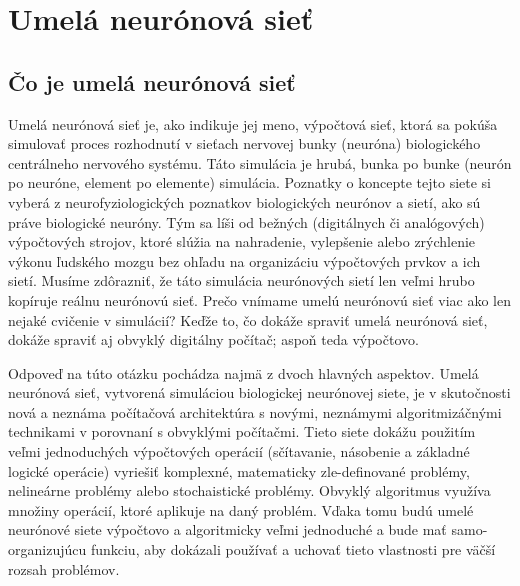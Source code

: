 \chapter{Umelá neurónová sieť}
\section{Čo je umelá neurónová sieť}
Umelá neurónová sieť je, ako indikuje jej meno, výpočtová sieť, ktorá sa pokúša simulovať proces rozhodnutí v sieťach nervovej bunky (neuróna) biologického centrálneho nervového systému. Táto simulácia je hrubá, bunka po bunke (neurón po neuróne, element po elemente) simulácia. Poznatky o koncepte tejto siete si vyberá z neurofyziologických poznatkov biologických neurónov a sietí, ako sú práve biologické neuróny. Tým sa líši od bežných  (digitálnych či analógových) výpočtových strojov, ktoré slúžia na nahradenie, vylepšenie alebo zrýchlenie výkonu ľudského mozgu bez ohľadu na organizáciu výpočtových prvkov a ich sietí. Musíme zdôrazniť, že táto simulácia neurónových sietí len veľmi hrubo kopíruje reálnu neurónovú sieť. Prečo vnímame  umelú neurónovú sieť viac ako len nejaké cvičenie v simulácií? Keďže to, čo dokáže spraviť umelá neurónová sieť, dokáže spraviť aj obvyklý digitálny počítač; aspoň teda výpočtovo.\cite{graupe}\par
Odpoveď na túto otázku pochádza najmä z dvoch hlavných aspektov. Umelá neurónová sieť, vytvorená simuláciou biologickej neurónovej siete, je v skutočnosti nová a neznáma počítačová architektúra s novými, neznámymi algoritmizáčnými technikami v porovnaní s obvyklými počítačmi. Tieto siete dokážu použitím veľmi jednoduchých výpočtových operácií (sčítavanie, násobenie a základné logické operácie) vyriešiť komplexné, matematicky zle-definované problémy, nelineárne problémy alebo stochaistické problémy. Obvyklý algoritmus využíva množiny operácií, ktoré aplikuje na daný problém. Vďaka tomu budú umelé neurónové siete výpočtovo a algoritmicky veľmi jednoduché a bude mať samo-organizujúcu funkciu, aby dokázali používať a uchovať tieto vlastnosti pre väčší rozsah problémov.\cite{graupe}

